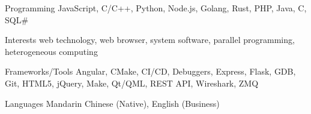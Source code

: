 
\begin{cvskills}
    \cvskill
    {Programming} %
    {JavaScript, C/C++, Python, Node.js, Golang, Rust, PHP, Java, C, SQL\#} %
    
    \cvskill
    {Interests} %
    {web technology, web browser, system software, parallel programming, heterogeneous computing} %

      \cvskill
        {Frameworks/Tools} %
        {Angular, CMake, CI/CD, Debuggers, Express, Flask, GDB, Git, HTML5, jQuery, Make, Qt/QML, REST API, Wireshark, ZMQ
        } %

      \cvskill
        {Languages} %
        {Mandarin Chinese (Native), English (Business)} %
    
\end{cvskills}
